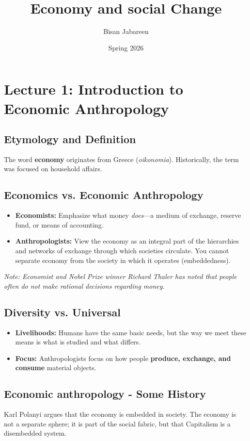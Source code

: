 \documentclass{article}
\title{Economy and social Change}
\author{Bisan Jabareen}
\date{Spring 2026}
\begin{document}
\maketitle
\newpage
\tableofcontents
\newpage
\section{Lecture 1: Introduction to Economic Anthropology}

\subsection{Etymology and Definition}
The word \textbf{economy} originates from Greece (\textit{oikonomia}). Historically, the term was focused on household affairs.

\subsection{Economics vs. Economic Anthropology}
\begin{itemize}
    \item \textbf{Economists:} Emphasize what money \textit{does}—a medium of exchange, reserve fund, or means of accounting.
    \item \textbf{Anthropologists:} View the economy as an integral part of the hierarchies and networks of exchange through which societies circulate. You cannot separate economy from the society in which it operates (embeddedness).
\end{itemize}

\textit{Note: Economist and Nobel Prize winner Richard Thaler has noted that people often do not make rational decisions regarding money.}

\subsection{Diversity vs. Universal}
\begin{itemize}
    \item \textbf{Livelihoods:} Humans have the same basic needs, but the way we meet these means is what is studied and what differs.
    \item \textbf{Focus:} Anthropologists focus on how people \textbf{produce, exchange, and consume} material objects.
\end{itemize}

\subsection{Economic anthropology - Some History}
    Karl Polanyi argues that the economy is embedded in society. The economy is not a separate sphere; it is part of the social fabric, but that Capitalism is a disembedded system.
\end{document}
